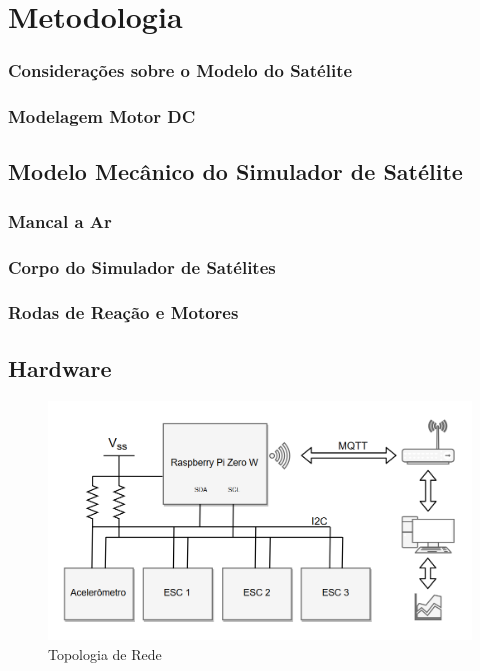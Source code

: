 \chapter{Metodologia}

\subsection{Considerações sobre o Modelo do Satélite}

\subsection{Modelagem Motor DC}

\section{Modelo Mecânico do Simulador de Satélite}

\subsection{Mancal a Ar}

\subsection{Corpo do Simulador de Satélites}

\subsection{Rodas de Reação e Motores}

\section{Hardware}

\begin{figure}[!ht]
  \caption{Topologia de Rede}
  \begin{center}
      \includegraphics[scale=.55]{img/comunicacao_projeto}
  \end{center}
  \label{fig:pid_neural_Applying_p18}
\end{figure}

